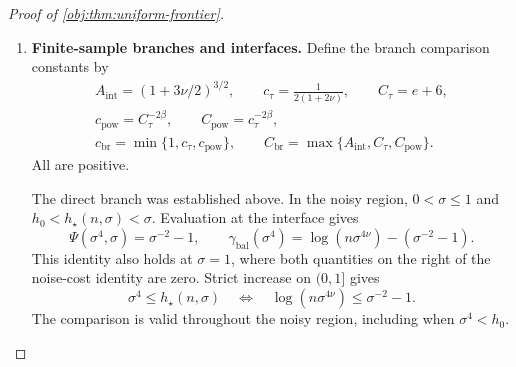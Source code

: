 \documentclass[11pt]{article}
\begin{document}
\begin{proof}[Proof of \cref{obj:thm:uniform-frontier}]
\begin{enumerate}
For completeness, the mean bounds imply
\[
|\theta(P)|=|\mu_1(P,0)-\mu_0(P,0)|\le\frac12.
\]
Thus the constant estimator zero has worst expected absolute error at most
\(1/2\), and the constant interval \([-1,1]\) has coverage one and length two.
Both extended minimax objectives are consequently finite. Conversion to real
numbers preserves their comparisons with the selected procedures.

Put
\[
C_{\mathrm{mat}}=2C_{\mathrm{up}}>0.
\]
Combining the lower comparisons, the finite certificate, and the upper comparison gives
\[
\begin{aligned}
c_{\mathrm{mat}}r_\beta(n,\sigma)
&\le R_\beta(n,\sigma)
\le\sup_{P\in\mathcal M_\beta(\sigma)}
 \mathbb E_{P,n}|\widetilde\theta_{\beta,n,\sigma}-\theta(P)|\\
&\le E_\beta(n,\sigma)
\le C_{\mathrm{mat}}r_\beta(n,\sigma),\\
c_{\mathrm{mat}}r_\beta(n,\sigma)
&\le\mathcal L_\beta(n,\sigma)
\le\sup_{P\in\mathcal M_\beta(\sigma)}
 \mathbb E_{P,n}\operatorname{length}(\widetilde I_{\beta,n,\sigma})\\
&\le2E_\beta(n,\sigma)
\le C_{\mathrm{mat}}r_\beta(n,\sigma).
\end{aligned}
\]
The lower transfer ranges over the stated randomized decision classes, with
arbitrary procedure degree.

\item \textbf{Finite-sample branches and interfaces.}
Define the branch comparison constants by
\[
\begin{gathered}
A_{\mathrm{int}}=(1+3\nu/2)^{3/2},\qquad
c_\tau=\frac1{2(1+2\nu)},\qquad C_\tau=e+6,\\
c_{\mathrm{pow}}=C_\tau^{-2\beta},\qquad
C_{\mathrm{pow}}=c_\tau^{-2\beta},\\
c_{\mathrm{br}}=\min\{1,c_\tau,c_{\mathrm{pow}}\},
\qquad
C_{\mathrm{br}}=\max\{A_{\mathrm{int}},C_\tau,C_{\mathrm{pow}}\}.
\end{gathered}
\]
All are positive.

The direct branch was established above. In the noisy region,
\(0<\sigma\le1\) and \(h_0<h_\star(n,\sigma)<\sigma\). Evaluation at the interface gives
\[
\Psi(\sigma^4,\sigma)=\sigma^{-2}-1,
\qquad
\gamma_{\mathrm{bal}}(\sigma^4)
=\log(n\sigma^{4\nu})-(\sigma^{-2}-1).
\]
This identity also holds at \(\sigma=1\), where both quantities on the right
of the noise-cost identity are zero. Strict increase on \((0,1]\) gives
\[
\sigma^4\le h_\star(n,\sigma)
\quad\Longleftrightarrow\quad
\log(n\sigma^{4\nu})\le\sigma^{-2}-1.
\]
The comparison is valid throughout the noisy region, including when
\(\sigma^4<h_0\).


\end{enumerate}
\end{proof}
\end{document}

